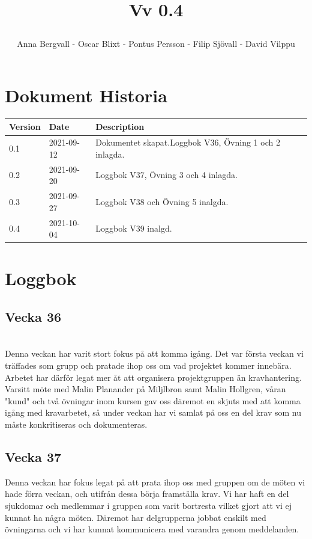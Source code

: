 \documentclass{article}
\date {#1}
\title {
    \documentNumber {01}    

    \documentTitle {Helsingborg Event and Convention Bureau}
    
    \documentDate {2021-08-20}
    \documentVersion Vv 0.4
    
    \author{Anna Bergvall - Oscar Blixt - Pontus Persson - Filip Sjövall - David Vilppu}
}
\begin{document}
\maketitle

\thispagestyle{empty}



\newpage

\tableofcontents


\newpage

\section{Dokument Historia}
\begin{tabular}{ l | l | l }
    Version & Date & Description \\
    \hline
    0.1 & 2021-09-12 & Dokumentet skapat.Loggbok V36, Övning 1 och 2 inlagda. \\
    \hline
    0.2 & 2021-09-20 & Loggbok V37, Övning 3 och 4 inlagda.
    \\
    \hline
    0.3 & 2021-09-27 & Loggbok V38 och Övning 5 inalgda.
    \\
    \hline
    0.4 & 2021-10-04 & Loggbok V39 inalgd.
\end{tabular}

\newpage

\section{Loggbok}
    \subsection{Vecka 36}
    \\
    Denna veckan har varit stort fokus på att komma igång. Det var första veckan vi träffades som grupp och pratade ihop oss om vad projektet kommer innebära. Arbetet har därför legat mer åt att organisera projektgruppen än kravhantering. \\ Varsitt möte med Malin Planander på Miljlbron samt Malin Hollgren, våran "kund" och två övningar inom kursen gav oss däremot en skjuts med att komma igång med kravarbetet, så under veckan har vi samlat på oss en del krav som nu måste konkritiseras och dokumenteras. 
    
    \subsection{Vecka 37}
    Denna veckan har fokus legat på att prata ihop oss med gruppen om de möten vi hade förra veckan, och utifrån dessa börja framställa krav. Vi har haft en del sjukdomar och medlemmar i gruppen som varit bortresta vilket gjort att vi ej kunnat ha några möten. Däremot har delgrupperna jobbat enskilt med övningarna och vi har kunnat kommunicera med varandra genom meddelanden.
    
\end{document}
